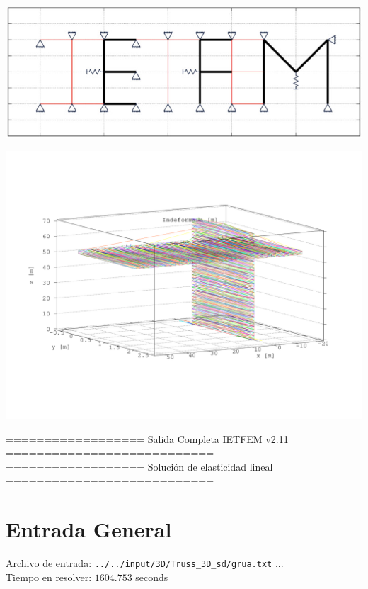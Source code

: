 \documentclass[a4paper,11pt]{article}
\begin{document}
\hspace{1.5cm}       
\begin{center}       
\includegraphics[width=.7\textwidth]{../../../../../../sources/Figs/logo_ietfem}      
\end{center}       
\begin{center}       
\includegraphics[width=.95\textwidth]{../../grua_indeformada.png}   
   \end{center}       

\newpage 

================== Salida Completa IETFEM v2.11 ===========================\\
================== Solución de elasticidad lineal ===========================
\tableofcontents     

\newpage     

\section{Entrada General} 

Archivo de entrada: \verb|../../input/3D/Truss_3D_sd/grua.txt|  ... \\

Tiempo en resolver: $1604.753$ seconds \\
\end{document}

